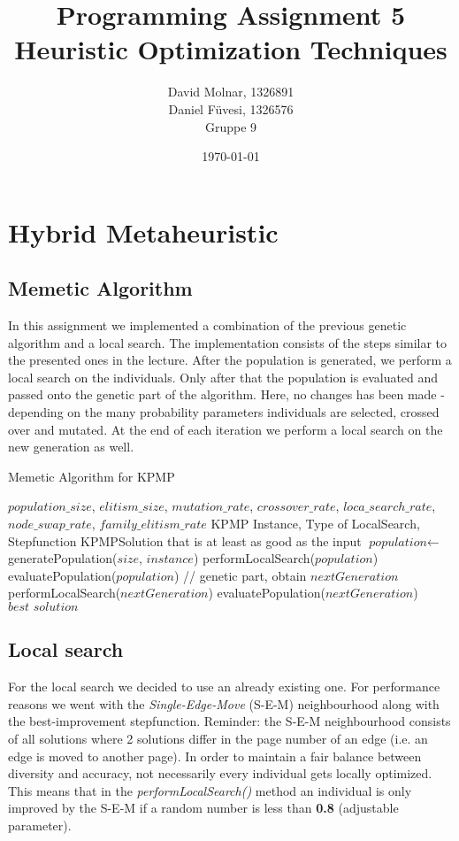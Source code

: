 \documentclass[11pt]{article}
\title{Programming Assignment 5\\ \vspace{10px} \large Heuristic Optimization Techniques}
\author{David Molnar, 1326891\\ Daniel Füvesi, 1326576\\Gruppe 9}
\date{\today}
\begin{document}
\lstset{language=Java}
\maketitle
 
\section{Hybrid Metaheuristic}
\subsection{Memetic Algorithm}
\hspace{0.5cm}In this assignment we implemented a combination of the previous genetic algorithm and a local search. The implementation consists of the steps similar to the presented ones in the lecture. After the population is generated, we perform a local search on the individuals. Only after that the population is evaluated and passed onto the genetic part of the algorithm. Here, no changes has been made - depending on the many probability parameters individuals are selected, crossed over and mutated. At the end of each iteration we perform a local search on the new generation as well.
\begin{algorithm}
	\caption{Memetic Algorithm for KPMP}\label{euclid}
	\begin{algorithmic}[1]
		\Variables
		\State $population\_size$, $elitism\_size$, $mutation\_rate$, $crossover\_rate$, $loca\_search\_rate$, $node\_swap\_rate$, $family\_elitism\_rate$
		\EndVariables
		\Require KPMP Instance, Type of LocalSearch, Stepfunction
		\Ensure KPMPSolution that is at least as good as the input
		\State $\textit{population} \gets $generatePopulation($size$, $instance$)
		\State performLocalSearch($population$)
		\State evaluatePopulation($population$)
		\State // genetic part, obtain $nextGeneration$
		\State performLocalSearch($nextGeneration$)
		\State evaluatePopulation($nextGeneration$)
		\EndWhile
		\Return $\textit{best solution}$
		\EndFunction
		
	\end{algorithmic}
\end{algorithm}
\subsection{Local search}
\hspace{0.5cm}For the local search we decided to use an already existing one. For performance reasons we went with the \textit{Single-Edge-Move} (S-E-M) neighbourhood along with the best-improvement stepfunction. Reminder: the S-E-M neighbourhood consists of all solutions where 2 solutions differ in the page number of an edge (i.e. an edge is moved to another page). In order to maintain a fair balance between diversity and accuracy, not necessarily every individual gets locally optimized. This means that in the \textit{performLocalSearch()} method an individual is only improved by the S-E-M if a random number is less than \textbf{0.8} (adjustable parameter). 
\end{document}
